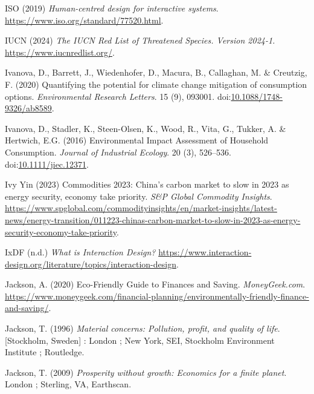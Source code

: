 \documentclass[
  letterpaper,
  DIV=11,
  numbers=noendperiod]{scrartcl}
\newlength{\cslhangindent}
\newenvironment{CSLReferences}[2] %
 {\begin{list}{}{%
  \setlength{\itemindent}{0pt}
  \setlength{\leftmargin}{0pt}
  \setlength{\parsep}{0pt}
  \ifodd #1
   \setlength{\leftmargin}{\cslhangindent}
   \setlength{\itemindent}{-1\cslhangindent}
  \fi
  \setlength{\itemsep}{#2\baselineskip}}}
 {\end{list}}
\begin{document}
\begin{CSLReferences}{0}{1}
ISO (2019) \emph{Human-centred design for interactive systems}.
\url{https://www.iso.org/standard/77520.html}.

IUCN (2024) \emph{The {IUCN Red List} of {Threatened Species}. {Version}
2024-1.} \url{https://www.iucnredlist.org/}.

Ivanova, D., Barrett, J., Wiedenhofer, D., Macura, B., Callaghan, M. \&
Creutzig, F. (2020) Quantifying the potential for climate change
mitigation of consumption options. \emph{Environmental Research
Letters}. 15 (9), 093001.
doi:\href{https://doi.org/10.1088/1748-9326/ab8589}{10.1088/1748-9326/ab8589}.

Ivanova, D., Stadler, K., Steen-Olsen, K., Wood, R., Vita, G., Tukker,
A. \& Hertwich, E.G. (2016) Environmental {Impact Assessment} of
{Household Consumption}. \emph{Journal of Industrial Ecology}. 20 (3),
526--536.
doi:\href{https://doi.org/10.1111/jiec.12371}{10.1111/jiec.12371}.

Ivy Yin (2023) Commodities 2023: {China}'s carbon market to slow in 2023
as energy security, economy take priority. \emph{S\&P Global Commodity
Insights}.
\url{https://www.spglobal.com/commodityinsights/en/market-insights/latest-news/energy-transition/011223-chinas-carbon-market-to-slow-in-2023-as-energy-security-economy-take-priority}.

IxDF (n.d.) \emph{What is {Interaction Design}?}
\url{https://www.interaction-design.org/literature/topics/interaction-design}.

Jackson, A. (2020) Eco-{Friendly Guide} to {Finances} and {Saving}.
\emph{MoneyGeek.com}.
\url{https://www.moneygeek.com/financial-planning/environmentally-friendly-finance-and-saving/}.

Jackson, T. (1996) \emph{Material concerns: Pollution, profit, and
quality of life}. {[}Stockholm, Sweden{]} : London ; New York, SEI,
Stockholm Environment Institute ; Routledge.

Jackson, T. (2009) \emph{Prosperity without growth: Economics for a
finite planet}. London ; Sterling, VA, Earthscan.


\end{CSLReferences}
\end{document}
